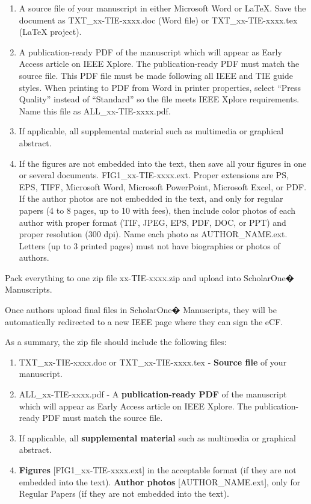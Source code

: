 \documentclass[journal]{IEEEtranTIE}
\begin{document}
\begin{enumerate}[1)]
	\item A source file of your manuscript in either Microsoft Word or LaTeX. Save the document as TXT\_xx-TIE-xxxx.doc (Word file) or TXT\_xx-TIE-xxxx.tex (LaTeX project).
	\item  A publication-ready PDF of the manuscript which will appear as Early Access article on IEEE Xplore. The publication-ready PDF must match the source file. This PDF file must be made following all IEEE and TIE guide styles. When printing to PDF from Word in printer properties, select  ``Press Quality'' instead of ``Standard'' so the file meets IEEE Xplore requirements. Name this file as ALL\_xx-TIE-xxxx.pdf.
	\item If applicable, all supplemental material such as multimedia or graphical abstract.
	\item If the figures are not embedded into the text, then save all your figures in one or several documents. FIG1\_xx-TIE-xxxx.ext. Proper extensions are PS, EPS, TIFF, Microsoft Word, Microsoft PowerPoint, Microsoft Excel, or PDF.	If the author photos are not embedded in the text, and only for regular papers (4 to 8 pages, up to 10 with fees), then include color photos of each author with proper format (TIF, JPEG, EPS, PDF, DOC, or PPT) and proper resolution (300 dpi). Name each photo as AUTHOR\_NAME.ext. Letters (up to 3 printed pages) must not have biographies or photos of authors.
\end{enumerate}

Pack everything to one zip file xx-TIE-xxxx.zip and upload into ScholarOne� Manuscripts.

Once authors upload final files in ScholarOne� Manuscripts, they will be automatically redirected to a new IEEE page where they can sign the eCF.

As a summary, the zip file should include the following files:

\begin{enumerate}[1)]
	\item TXT\_xx-TIE-xxxx.doc or TXT\_xx-TIE-xxxx.tex - \textbf{Source file} of your manuscript.	
	\item ALL\_xx-TIE-xxxx.pdf -  A \textbf{publication-ready PDF} of the manuscript which will appear as Early Access article on IEEE Xplore. The publication-ready PDF must match the source file.
	\item If applicable, all \textbf{supplemental material} such as multimedia or graphical abstract.
	\item \textbf{Figures} [FIG1\_xx-TIE-xxxx.ext] in the acceptable format (if they are not embedded into the text). \textbf{Author photos} [AUTHOR\_NAME.ext], only for Regular Papers (if they are not embedded into the text).
	
\end{enumerate}
\end{document}
